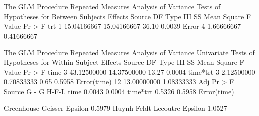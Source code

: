 \documentclass{article}
\begin{document}
\begin{Woutput}
The GLM Procedure
Repeated Measures Analysis of Variance
Tests of Hypotheses for Between Subjects Effects
Source                    DF   Type III SS   Mean Square  F Value  Pr > F
trt                        1   15.04166667   15.04166667    36.10  0.0039
Error                      4    1.66666667    0.41666667

The GLM Procedure
Repeated Measures Analysis of Variance
Univariate Tests of Hypotheses for Within Subject Effects
Source                    DF   Type III SS   Mean Square  F Value  Pr > F
time                       3   43.12500000   14.37500000    13.27  0.0004
time*trt                   3    2.12500000    0.70833333     0.65  0.5958
Error(time)               12   13.00000000    1.08333333
                         Adj Pr > F
Source                 G - G     H-F-L
time                  0.0043    0.0004
time*trt              0.5326    0.5958
Error(time)

Greenhouse-Geisser Epsilon      0.5979
Huynh-Feldt-Lecoutre Epsilon    1.0527
\end{Woutput}
\end{document}
